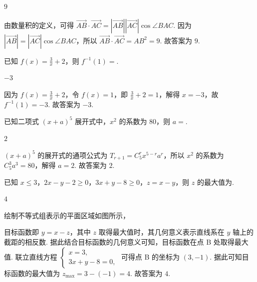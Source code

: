 \begin{answer}
\(9\)
\end{answer}

\begin{solution}
由数量积的定义，可得 \(\overrightarrow{AB}\cdot \overrightarrow{AC}=\left| \overrightarrow{AB} \right|\left| \overrightarrow{AC} \right|\cos \angle BAC\). 因为 \(\left| \overrightarrow{AB} \right|=\left| \overrightarrow{AC} \right|\cos \angle BAC\)，所以 \(\overrightarrow{AB}\cdot \overrightarrow{AC}=AB^2=9\). 故答案为 \(9\).
\end{solution}

\begin{problem}
已知 \(f(x)=\frac{3}{x}+2\)，则 \(f^{-1}(1)=\)\fillinblank{}.
\end{problem}

\begin{answer}
\(-3\)
\end{answer}

\begin{solution}
因为 \(f(x)=\frac{3}{x}+2\)，令 \(f(x)=1\)，即 \(\frac{3}{x}+2=1\)，解得 \(x=-3\)，故 \(f^{-1}(1)=-3\). 故答案为 \(-3\).
\end{solution}

\begin{problem}
已知二项式 \((x+a)^5\) 展开式中，\(x^2\) 的系数为 \(80\)，则 \(a=\)\fillinblank{}.
\end{problem}

\begin{answer}
\(2\)
\end{answer}

\begin{solution}
\((x+a)^5\) 的展开式的通项公式为 \(T_{r+1}=C_5^r x^{5-r}a^r\)，所以 \(x^2\) 的系数为 \(C_5^3 a^3=80\)，解得 \(a=2\). 故答案为 \(2\).
\end{solution}

\begin{problem}
已知 \(x\le 3\)，\(2x-y-2\ge 0\)，\(3x+y-8\ge 0\)，\(z=x-y\)，则 \(z\) 的最大值为\fillinblank{}.
\end{problem}

\begin{answer}
\(4\)
\end{answer}

\begin{solution}
绘制不等式组表示的平面区域如图所示，


目标函数即 \(y=x-z\)，其中 \(z\) 取得最大值时，其几何意义表示直线系在 \(y\) 轴上的截距的相反数. 据此结合目标函数的几何意义可知，目标函数在点 B 处取得最大值. 联立直线方程 \(\begin{cases}
x=3,\\
3x+y-8=0,
\end{cases}\) 可得点 B 的坐标为 \((3,-1)\). 据此可知目标函数的最大值为 \(z_{\max}=3-\left( -1 \right)=4\). 故答案为 \(4\).
\end{solution}

